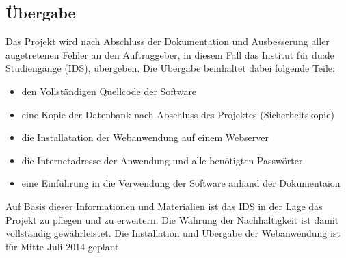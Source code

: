 \subsection{Übergabe}
\label{sec:Uebergabe}

Das Projekt wird nach Abschluss der Dokumentation und Ausbesserung aller augetretenen Fehler an den Auftraggeber, in diesem Fall das Institut für duale Studiengänge (IDS), übergeben. Die Übergabe beinhaltet dabei folgende Teile:

\begin{itemize}
  \item den Vollständigen Quellcode der Software
  \item eine Kopie der Datenbank nach Abschluss des Projektes (Sicherheitskopie)
  \item die Installatation der Webanwendung auf einem Webserver
  \item die Internetadresse der Anwendung und alle benötigten Passwörter
  \item eine Einführung in die Verwendung der Software anhand der Dokumentaion
\end{itemize}

Auf Basis dieser Informationen und Materialien ist das IDS in der Lage das Projekt zu pflegen und zu erweitern. Die Wahrung der Nachhaltigkeit ist damit vollständig gewährleistet. Die Installation und Übergabe der Webanwendung ist für Mitte Juli 2014 geplant.